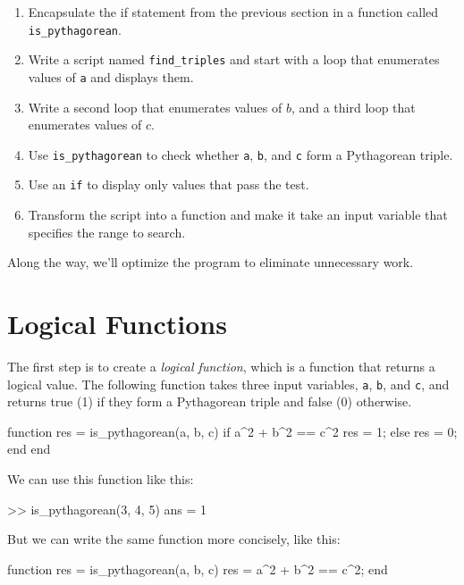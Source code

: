 \begin{enumerate}

\item Encapsulate the if statement from the previous section in a function called \verb"is_pythagorean".

\item Write a script named \verb"find_triples" and start with a loop that enumerates values of {\tt a} and displays them.

\item Write a second loop that enumerates values of $b$, and a third loop that enumerates values of $c$.

\item Use {\tt is_pythagorean} to check whether {\tt a}, {\tt b}, and {\tt c} form a Pythagorean triple.

\item Use an {\tt if} to display only values that pass the test.

\item Transform the script into a function and make it take an input variable that specifies the range to search.

\end{enumerate}

Along the way, we'll optimize the program to eliminate unnecessary work.


\section{Logical Functions}

The first step is to create a {\em logical function}, which is a function that returns a logical value.
The following function takes three input variables, {\tt a}, {\tt b}, and {\tt c}, and returns true (1) if they form a Pythagorean triple and false (0) otherwise.

\begin{code}
function res = is_pythagorean(a, b, c)
    if a^2 + b^2 == c^2
        res = 1;
    else
        res = 0;
    end
end
\end{code}

We can use this function like this:

\begin{code}
>> is_pythagorean(3, 4, 5)
ans = 1
\end{code}

But we can write the same function more concisely, like this:

\begin{code}
function res = is_pythagorean(a, b, c)
    res = a^2 + b^2 == c^2;
end
\end{code}

